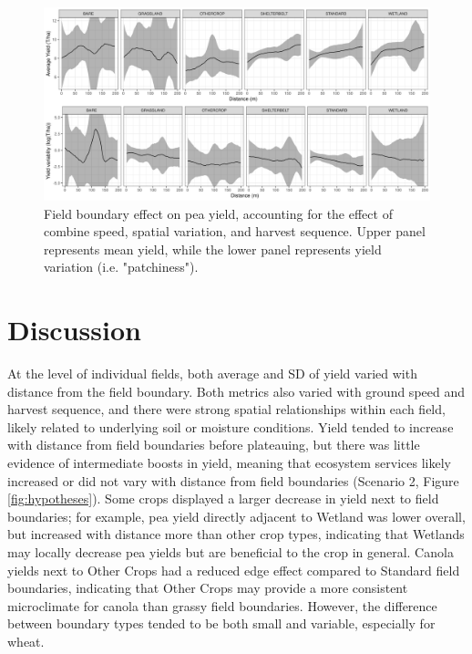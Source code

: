 \documentclass[]{elsarticle} %
\begin{document}
\begin{figure}
\includegraphics[width=1\linewidth]{../Figures/ModelSummary3a_peas} \caption{Field boundary effect on pea yield, accounting for the effect of combine speed, spatial variation, and harvest sequence. Upper panel represents mean yield, while the lower panel represents yield variation (i.e. "patchiness").}\label{fig:peaPlot}
\end{figure}

\hypertarget{discussion}{%
\section{Discussion}\label{discussion}}

At the level of individual fields, both average and SD of yield varied with distance from the field boundary.
Both metrics also varied with ground speed and harvest sequence, and there were strong spatial relationships within each field, likely related to underlying soil or moisture conditions.
Yield tended to increase with distance from field boundaries before plateauing, but there was little evidence of intermediate boosts in yield, meaning that ecosystem services likely increased or did not vary with distance from field boundaries (Scenario 2, Figure \ref{fig:hypotheses}).
Some crops displayed a larger decrease in yield next to field boundaries; for example, pea yield directly adjacent to Wetland was lower overall, but increased with distance more than other crop types, indicating that Wetlands may locally decrease pea yields but are beneficial to the crop in general.
Canola yields next to Other Crops had a reduced edge effect compared to Standard field boundaries, indicating that Other Crops may provide a more consistent microclimate for canola than grassy field boundaries.
However, the difference between boundary types tended to be both small and variable, especially for wheat.
\end{document}
